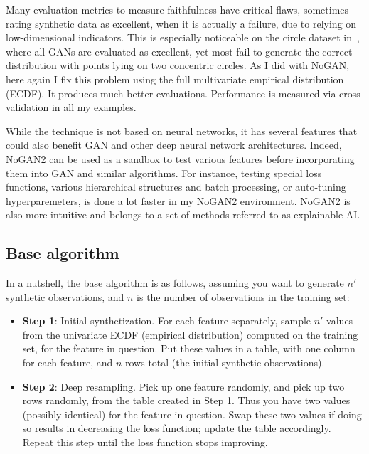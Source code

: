 \documentclass[oneside,10pt]{book}
\begin{document}
Many evaluation metrics to measure faithfulness have critical flaws, sometimes rating synthetic data as excellent, when it is actually a failure, due to relying on low-dimensional indicators.
This is especially noticeable on the circle dataset in~\cite{vgvendors}, where all GANs are evaluated as excellent, yet most
 fail to generate the correct distribution with points lying on two concentric circles.   As I did with NoGAN, here again I fix this problem using the full \textcolor{index}{multivariate empirical distribution} (ECDF).  It produces much better evaluations. Performance is measured via  \textcolor{index}{cross-validation} in all my examples.

While the technique is not based on neural networks, it has several features that could also benefit GAN and other deep neural network architectures.
 Indeed, NoGAN2 can be used as a sandbox to test various features before incorporating them into GAN and similar algorithms. For instance, testing
 special loss functions, various hierarchical structures and batch processing, or auto-tuning hyperparemeters, is done a lot faster in my NoGAN2
 environment. NoGAN2 is also more intuitive and belongs to a set of methods referred to as \textcolor{index}{explainable AI}.

\subsection{Base algorithm}\label{poireswds}

In a nutshell, the base algorithm is as follows, assuming you want to generate $n'$ synthetic observations, and $n$ is the number of observations in the training set:\vspace{1ex}

\begin{itemize}
\item[]{\bf Step 1}: Initial synthetization. For each feature separately, sample $n'$ values from the univariate \textcolor{index}{ECDF} (empirical distribution) computed on the training set, for the feature in question.
Put these values in a table, with one column for each feature, and $n$ rows total (the initial synthetic observations).
\vspace{1ex}
\item[]{\bf Step 2}: Deep resampling. Pick up one feature randomly, and pick up two rows randomly, from the table created in Step 1. Thus you have
 two values (possibly identical) for the feature in question. Swap these two values if doing so results in decreasing the
\textcolor{index}{loss function};  update the table accordingly. Repeat this step
 until the loss function stops improving.
\end{itemize}\vspace{1ex}
\end{document}
